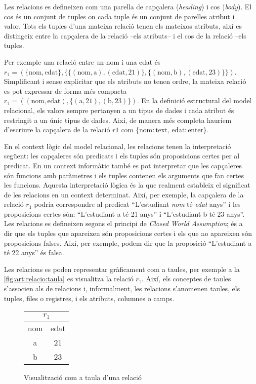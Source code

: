 Les relacions es defineixen com una parella de capçalera
(\emph{heading}) i cos (\emph{body}). El cos és un conjunt de tuples
on cada tuple és un conjunt de parelles atribut i valor. Tots els
tuples d'una mateixa relació tenen els mateixos atributs, així es
distingeix entre la capçalera de la relació --els atributs-- i el cos
de la relació --els tuples.

Per exemple una relació entre un nom i una edat és
$r_1=(\{\text{nom},\text{edat} \}, \{
\{(\text{nom},\text{a}),(\text{edat},21)\},
\{(\text{nom},\text{b}),(\text{edat},23) \} \})$.  Simplificant i
sense explicitar que els atributs no tenen ordre, la mateixa relació
es pot expressar de forma més compacta $r_1=(
(\text{nom},\text{edat}), \{ (\text{a},21),(\text{b},23) \})$.  En la
definició estructural del model relacional, els valors sempre
pertanyen a un tipus de dades i cada atribut és restringit a un únic
tipus de dades. Així, de manera més completa hauríem d'escriure la
capçalera de la relació $r1$ com $\{\text{nom}: \text{text},\,
\text{edat}:\text{enter} \}$.


En el context lògic del model relacional, les relacions tenen la
interpretació següent: les capçaleres són predicats i els tuples són
proposicions certes per al predicat. En un context informàtic també es
pot interpretar que les capçaleres són funcions amb paràmetres i els
tuples contenen els arguments que fan certes les funcions. 
Aquesta interpretació lògica és la que realment estableix el
significat de les relacions en un context determinat.  Així, per
exemple, la capçalera de la relació $r_1$ podria correspondre al
predicat ``L'estudiant \emph{nom} té \emph{edat} anys'' i les
proposicions certes són: ``L'estudiant a té 21 anys'' i ``L'estudiant
b té 23 anys''.  Les relacions es defineixen segons el principi de
\emph{Closed World Assumption}; és a dir que els tuples que apareixen
són proposicions certes i els que no apareixen són proposicions
falses. Així, per exemple, podem dir que la proposició ``L'estudiant a
té 22 anys'' és falsa.



Les relacions es poden representar gràficament com a taules, per
exemple a la \autoref{fig:art:relacio:taula} es visualitza la relació
$r_1$.  Així, els conceptes de taules s'associen als de relacions i,
informalment, les relacions s'anomenen taules, els tuples, files o
registres, i els atributs, columnes o camps.

\begin{figure}[tp]
  \centering
  \begin{tabular}[c]{|c|c|}
    \multicolumn{2}{c}{$r_1$} \\ \hline
    nom  & edat \\ \hline
    a  & 21 \\
    b  & 23 \\ \hline
  \end{tabular} 
  \caption{Visualització com a taula d'una relació}
  \label{fig:art:relacio:taula}
\end{figure}

